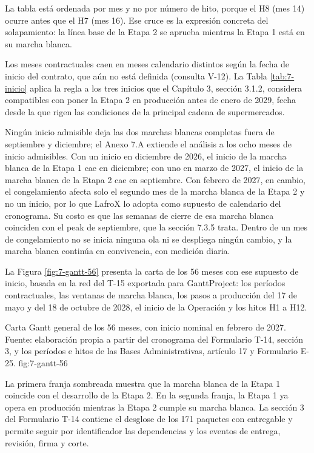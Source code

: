 
La tabla está ordenada por mes y no por número de hito, porque el H8 (mes 14) ocurre antes que el H7 (mes 16). Ese cruce es la expresión concreta del solapamiento: la línea base de la Etapa 2 se aprueba mientras la Etapa 1 está en su marcha blanca.

Los meses contractuales caen en meses calendario distintos según la fecha de inicio del contrato, que aún no está definida (consulta V-12). La Tabla \ref{tab:7-inicio} aplica la regla a los tres inicios que el Capítulo 3, sección 3.1.2, considera compatibles con poner la Etapa 2 en producción antes de enero de 2029, fecha desde la que rigen las condiciones de la principal cadena de supermercados.


Ningún inicio admisible deja las dos marchas blancas completas fuera de septiembre y diciembre; el Anexo 7.A extiende el análisis a los ocho meses de inicio admisibles. Con un inicio en diciembre de 2026, el inicio de la marcha blanca de la Etapa 1 cae en diciembre; con uno en marzo de 2027, el inicio de la marcha blanca de la Etapa 2 cae en septiembre. Con febrero de 2027, en cambio, el congelamiento afecta solo el segundo mes de la marcha blanca de la Etapa 2 y no un inicio, por lo que LafroX lo adopta como supuesto de calendario del cronograma. Su costo es que las semanas de cierre de esa marcha blanca coinciden con el peak de septiembre, que la sección 7.3.5 trata. Dentro de un mes de congelamiento no se inicia ninguna ola ni se despliega ningún cambio, y la marcha blanca continúa en convivencia, con medición diaria.

La Figura \ref{fig:7-gantt-56} presenta la carta de los 56 meses con ese supuesto de inicio, basada en la red del T-15 exportada para GanttProject: los períodos contractuales, las ventanas de marcha blanca, los pasos a producción del 17 de mayo y del 18 de octubre de 2028, el inicio de la Operación y los hitos H1 a H12.

  {Carta Gantt general de los 56 meses, con inicio nominal en febrero de 2027. Fuente: elaboración propia a partir del cronograma del Formulario T-14, sección 3, y los períodos e hitos de las Bases Administrativas, artículo 17 y Formulario E-25.}
  {fig:7-gantt-56}

La primera franja sombreada muestra que la marcha blanca de la Etapa 1 coincide con el desarrollo de la Etapa 2. En la segunda franja, la Etapa 1 ya opera en producción mientras la Etapa 2 cumple su marcha blanca. La sección 3 del Formulario T-14 contiene el desglose de los 171 paquetes con entregable y permite seguir por identificador las dependencias y los eventos de entrega, revisión, firma y corte.

